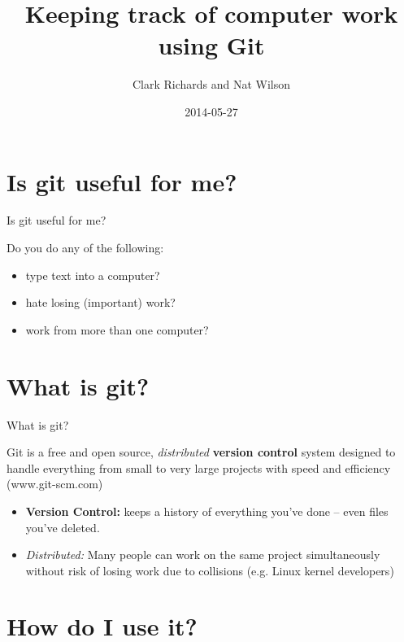 \documentclass{beamer}
\title[Git MTM] %
{Keeping track of computer work using Git}
\subtitle
{}
\author
{Clark Richards and Nat Wilson}
\date%
{2014-05-27}
\begin{document}
\begin{frame}
  \titlepage
\end{frame}



\section{Is git useful for me?}

\begin{frame}{Is git useful for me?}

Do you do any of the following:
\begin{itemize}
\item<1-3> type text into a computer?
\item<2-3> hate losing (important) work?
\item<3> work from more than one computer?
\end{itemize}

\end{frame}

\section{What is git?}

\begin{frame}{What is git?}

  Git is a free and open source, {\it distributed} {\bf version
    control} system designed to handle everything from small to very
  large projects with speed and efficiency (www.git-scm.com)
  \vspace{2em}
  \begin{itemize}
  \item {\bf Version Control:} keeps a history of everything you've
    done -- even files you've deleted.
  \item {\it Distributed:} Many people can work on the same project
    simultaneously without risk of losing work due to collisions
    (e.g. Linux kernel developers)
  \end{itemize}
\end{frame}

\section{How do I use it?}
\end{document}
